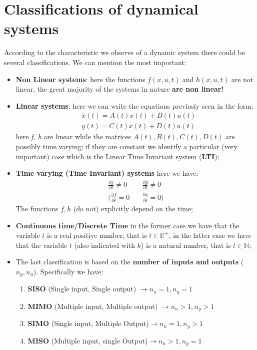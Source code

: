 \section{Classifications of dynamical systems}
According to the characteristic we observe of a dynamic system there could be several classifications. We can mention the most important: 
\begin{itemize}
    \item \textbf{Non Linear systems}: here the functions $f(x,u,t)$ and $h(x,u,t)$ are not linear, the great majority of the systems in nature \textbf{are non linear!}
    \item \textbf{Linear systems}: here we can write the equations previosly seen in the form: 
    \begin{align*}
        &\dot{x}(t) =A(t)x(t)+B(t)u(t)\\
        &y(t)=C(t)x(t)+D(t)u(t)
    \end{align*}
    here \textit{f, h} are linear while the matrices $A(t), B(t), C(t), D(t)$ are possibly time varying; if they are constant we identify a particular (very important) case which is the Linear Time Invariant system (\textbf{LTI}); 
    \item \textbf{Time varying (Time Invariant) systems} here we have: 
    \begin{align*}
        \frac{\partial f}{\partial t}\ne0     \quad   &\frac{\partial g}{\partial t}\ne 0\\
        (\frac{\partial f}{\partial t}= 0     \quad   &\frac{\partial g}{\partial t}= 0)
    \end{align*}
    The functions $f, h$ (do not) explicitly depend on the time; 
    \item  \textbf{Continuous time/Discrete Time} in the former case we have that the variable $t$ is a real positive number, that is $t\in\mathbb{R}^+$, in the latter case we have that the variable $t$ (also indicated with $k$) is a natural number, that is $t\in \mathbb{N}$;
    \item The last classification is based on the \textbf{number of inputs and outputs} ($n_y, n_u$). Specifically we have:
    \begin{enumerate}
        \item \textbf{SISO} (Single input, Single output) $\rightarrow n_u=1, n_y=1$
        \item \textbf{MIMO} (Multiple input, Multiple output) $\rightarrow n_u>1, n_y>1$
        \item \textbf{SIMO} (Single input, Multiple Output)$\rightarrow n_u=1, n_y>1$ 
        \item \textbf{MISO} (Multiple input, single Output)$\rightarrow n_u>1, n_y=1$ 
    \end{enumerate}
    
\end{itemize}
